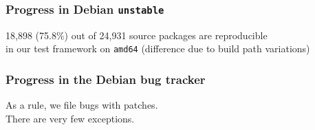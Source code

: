 \documentclass[14pt]{beamer}
\begin{document}
\begin{frame}
 \frametitle{Progress in Debian \texttt{unstable}}
 \begin{center}
  \footnotesize{18,898 (75.8\%) out of 24,931 source packages are reproducible \\
    in our test framework on \texttt{amd64}} (difference due to build path variations)
  \vfill
 \end{center}
\end{frame}


\begin{frame}
 \frametitle{Progress in the Debian bug tracker}
 \begin{center}
  \footnotesize{As a rule, we file bugs with patches. \\
  There are very few exceptions.}
  \vfill
 \end{center}
\end{frame}
\end{document}
